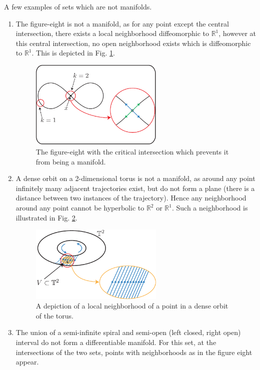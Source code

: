 \begin{ex}
	A few examples of sets which are not manifolds.
	\begin{enumerate}
		\item The figure-eight is not a manifold, as for any point except the central intersection, there exists a local neighborhood diffeomorphic to $\mathbb{R}^{1}$, however at this central intersection, no open neighborhood exists which is diffeomorphic to $\mathbb{R}^{1}$. This is depicted in Fig. \ref{fig:figure_eight}.
			\begin{figure}[h!]
				\centering
				\includegraphics[width=0.6\textwidth]{figures/ch9/3b_figure_eight.pdf}
				\caption{The figure-eight with the critical intersection which prevents it from being a manifold.}
				\label{fig:figure_eight}
			\end{figure}
		\item A dense orbit on a 2-dimensional torus is not a manifold, as around any point infinitely many adjacent trajectories exist, but do not form a plane (there is a distance between two instances of the trajectory). Hence any neighborhood around any point cannot be hyperbolic to $\mathbb{R}^{2}$ or $\mathbb{R}^{1}$. Such a neighborhood is illustrated in Fig. \ref{fig:dense_orbit_mfd}.
			\begin{figure}[h!]
				\centering
				\includegraphics[width=0.6\textwidth]{figures/ch9/4dense_orbits_mfd.pdf}
				\caption{A depiction of a local neighborhood of a point in a dense orbit of the torus.}
				\label{fig:dense_orbit_mfd}
			\end{figure}
		\item The union of a semi-infinite spiral and semi-open (left closed, right open) interval do not form a differentiable manifold. For this set, at the intersections of the two sets, points with neighborhoods as in the figure eight appear.
	\end{enumerate}
\end{ex}


